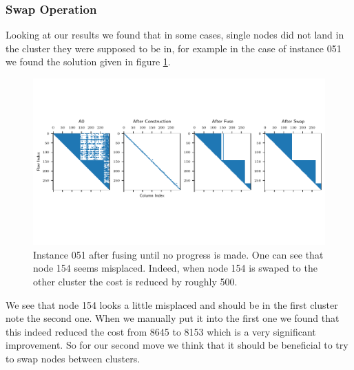 \subsubsection{Swap Operation}
Looking at our results we found that in some cases, single nodes did not land in the cluster they were supposed 
to be in, for example in the case of instance 051 we found the solution given in figure \ref{fig:051_swap}.\\
\null
\begin{figure}[h]
\includegraphics[width=\linewidth, trim= {0 3cm 0 0.9cm}]{figures/spy_adjacency2.pdf}
\caption{\label{fig:051_swap} Instance 051 after fusing until no progress is made. One can see that node 154 seems misplaced. Indeed, when node 154 is swaped to the other cluster the cost is reduced by roughly 500.}
\end{figure}

We see that node 154 looks a little misplaced and should be in the first cluster note the second one. 
When we manually put it into the first one we found that this indeed reduced the cost from 8645 to 8153 
which is a very significant improvement. So for our second move we think that it should be beneficial to 
try to swap nodes between clusters.\\

